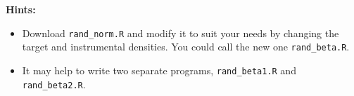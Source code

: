 \documentclass[11pt,english]{article}
\begin{document}
\textbf{Hints:}

\begin{itemize}
\item Download \texttt{rand\_norm.R} and modify it to suit your needs by changing the target and instrumental densities.  You could call the new one \texttt{rand\_beta.R}.
\item It may help to write two separate programs, \texttt{rand\_beta1.R} and \texttt{rand\_beta2.R}.
\end{itemize}
\end{document}
